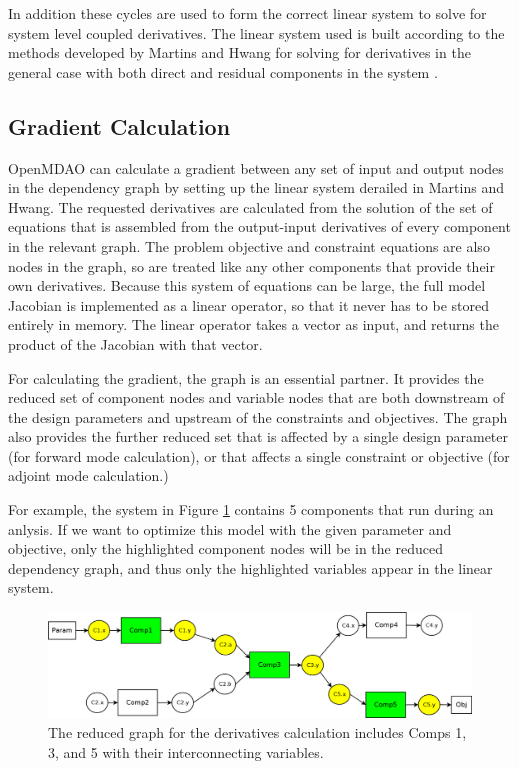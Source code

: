 \documentclass[]{aiaa-tc} %
\begin{document}
    In addition these cycles are used to form the correct linear system to solve for system level coupled 
    derivatives. The linear system used is built according to the methods developed by Martins and Hwang
    for solving for derivatives in the general case with both direct and residual 
    components in the system \cite{Martins2012}.

    \subsection{Gradient Calculation}
    
    OpenMDAO can calculate a gradient between any set of input and output nodes in the
    dependency graph by setting up the linear system derailed in Martins and Hwang. \cite{Martins2012}
    The requested derivatives are calculated from the solution of the set of equations that is assembled
    from the output-input derivatives of every component in the relevant graph. The problem objective
    and constraint equations are also nodes in the graph, so are treated like any other components
    that provide their own derivatives. Because this system of equations can be large, the full model
    Jacobian is implemented as a linear operator, so that it never has to be stored entirely in memory. The
    linear operator takes a vector as input, and returns the product of the Jacobian with that vector.
    
    For calculating the gradient, the graph is an essential partner. It provides the reduced set of 
    component nodes and variable nodes that are both downstream of the design parameters
    and upstream of the constraints and objectives. The graph also provides the further reduced
    set that is affected by a single design parameter (for forward mode calculation), or that
    affects a single constraint or objective (for adjoint mode calculation.)
    
    For example, the system in Figure \ref{fig:graph2} contains 5 components that run during an anlysis. If we
    want to optimize this model with the given parameter and objective, only the highlighted component nodes
    will be in the reduced dependency graph, and thus only the highlighted variables appear in the linear
    system.
    
    \begin{figure}[!htb]\begin{center}
      \includegraphics[width=.8\textwidth]{images/Graph2}
      \caption{ The reduced graph for the derivatives calculation includes Comps 1, 3, and 5 with their interconnecting variables. \label{fig:graph2}}
    \end{center}\end{figure}
\end{document}

